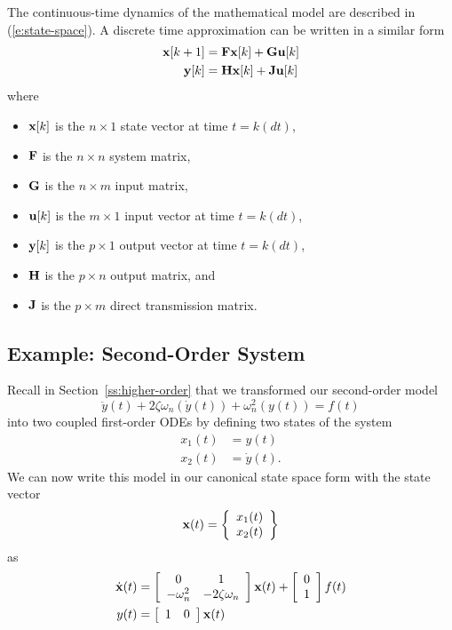 The continuous-time dynamics of the mathematical model are described in (\ref{e:state-space}).  A discrete time approximation can be written in a similar form
\begin{align}
\label{e:state-spaced}
\mbox{${\bf x}$}[k+1] & = \mbox{${\bf F}$} \mbox{${\bf x}$}[k] + \mbox{${\bf G}$}\mbox{${\bf u}$}[k] \nonumber \\
\mbox{${\bf y}$}[k] & = \mbox{${\bf H}$}\mbox{${\bf x}$}[k] + \mbox{${\bf J}$}\mbox{${\bf u}$}[k]
\end{align}
where
\begin{itemize}
\item $\mbox{${\bf x}$}[k]$ is the $n \times 1$ state vector at time $t=k(dt)$,
\item $\mbox{${\bf F}$}$ is the $n \times n$ system matrix,
\item $\mbox{${\bf G}$}$ is the $n \times m$ input matrix,
\item $\mbox{${\bf u}$}[k]$ is the $m \times 1$ input vector at time $t=k(dt)$,
\item $\mbox{${\bf y}$}[k]$ is the $p \times 1$ output vector at time $t=k(dt)$,
\item $\mbox{${\bf H}$}$ is the $p \times n$ output matrix, and
\item $\mbox{${\bf J}$}$ is the $p \times m$ direct transmission matrix.
\end{itemize}

\subsection{Example: Second-Order System}
Recall in Section~\ref{ss:higher-order} that we transformed our second-order model 
\begin{equation}\label{e:2ndagain}
\ddot{y}(t) + 2 \zeta \omega_n (\dot{y}(t)) + \omega_n^2 (y(t)) = f(t)
\end{equation}
into two coupled first-order ODEs by defining two states of the system
\begin{align}\label{e:2states}
x_1(t) & = y(t) \nonumber \\
x_2(t) & = \dot{y}(t).
\end{align}
We can now write this model in our canonical state space form with the state vector
\[
\mbox{${\bf x}$}(t)  =  \left\{ \begin{array}{c}
x_1(t) \\
x_2(t) 
\end{array} \right\}
\]
as 
\begin{align}\label{e:state-space-2d}
\dot{\mbox{${\bf x}$}}(t) & = \left[ \begin{array}{cc}
0 & 1 \\
-\omega_n^2 & -2 \zeta \omega_n  
\end{array} \right] \mbox{${\bf x}$}(t) + 
\left[ \begin{array}{c}
0 \\
1
\end{array}\right]
f(t) \nonumber \\
y(t) & = \left[ \begin{array}{cc} 1 & 0 \end{array} \right] \mbox{${\bf x}$}(t)
\end{align}

